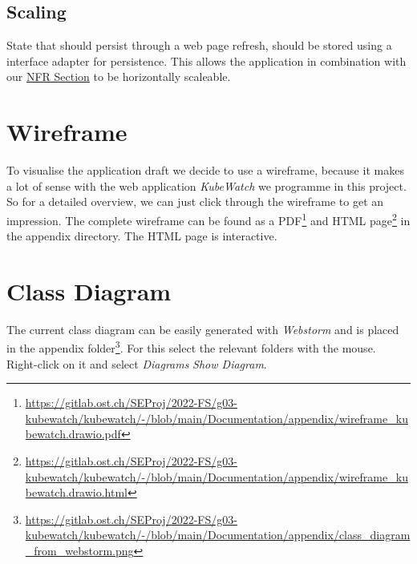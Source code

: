 \subsection{Scaling}

State that should persist through a web page refresh, should be stored using a interface adapter for persistence. This allows the application in combination with our \hyperref[section:non-functional-requirements]{NFR Section} to be horizontally scaleable.

\section{Wireframe}
To visualise the application draft we decide to use a wireframe, because it makes a lot of sense with the web application \textit{KubeWatch} we programme in this project. So for a detailed overview, we can just click through the wireframe to get an impression.
The complete wireframe can be found as a PDF\footnote{\url{https://gitlab.ost.ch/SEProj/2022-FS/g03-kubewatch/kubewatch/-/blob/main/Documentation/appendix/wireframe_kubewatch.drawio.pdf}} and HTML page\footnote{\url{https://gitlab.ost.ch/SEProj/2022-FS/g03-kubewatch/kubewatch/-/blob/main/Documentation/appendix/wireframe_kubewatch.drawio.html}} in the appendix directory.
The HTML page is interactive.

\section{Class Diagram}
The current class diagram can be easily generated with \textit{Webstorm} and is placed in the appendix folder\footnote{\url{https://gitlab.ost.ch/SEProj/2022-FS/g03-kubewatch/kubewatch/-/blob/main/Documentation/appendix/class_diagram_from_webstorm.png}}.
For this select the relevant folders with the mouse.
Right-click on it and select \textit{Diagrams} \textrightarrow \textit{Show Diagram}.
